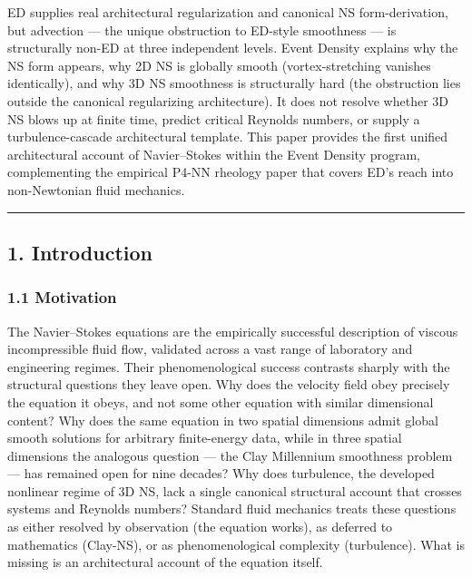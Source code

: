 \documentclass[
  11pt,a4paper]{article}
\begin{document}
ED supplies real architectural regularization and canonical NS
form-derivation, but advection --- the unique obstruction to ED-style
smoothness --- is structurally non-ED at three independent levels. Event
Density explains why the NS form appears, why 2D NS is globally smooth
(vortex-stretching vanishes identically), and why 3D NS smoothness is
structurally hard (the obstruction lies outside the canonical
regularizing architecture). It does not resolve whether 3D NS blows up
at finite time, predict critical Reynolds numbers, or supply a
turbulence-cascade architectural template. This paper provides the first
unified architectural account of Navier--Stokes within the Event Density
program, complementing the empirical P4-NN rheology paper that covers
ED's reach into non-Newtonian fluid mechanics.

\begin{center}\rule{0.5\linewidth}{0.5pt}\end{center}

\subsection{1. Introduction}\label{introduction}

\subsubsection{1.1 Motivation}\label{motivation}

The Navier--Stokes equations are the empirically successful description
of viscous incompressible fluid flow, validated across a vast range of
laboratory and engineering regimes. Their phenomenological success
contrasts sharply with the structural questions they leave open. Why
does the velocity field obey precisely the equation it obeys, and not
some other equation with similar dimensional content? Why does the same
equation in two spatial dimensions admit global smooth solutions for
arbitrary finite-energy data, while in three spatial dimensions the
analogous question --- the Clay Millennium smoothness problem --- has
remained open for nine decades? Why does turbulence, the developed
nonlinear regime of 3D NS, lack a single canonical structural account
that crosses systems and Reynolds numbers? Standard fluid mechanics
treats these questions as either resolved by observation (the equation
works), as deferred to mathematics (Clay-NS), or as phenomenological
complexity (turbulence). What is missing is an architectural account of
the equation itself.
\end{document}
